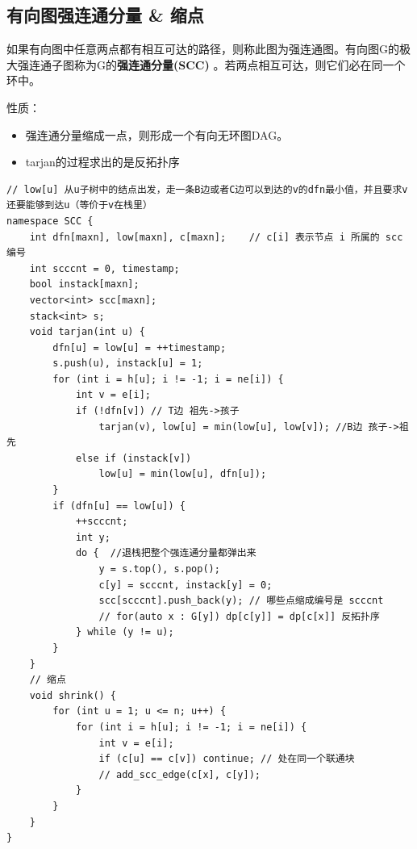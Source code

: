 \subsection{有向图强连通分量 \& 缩点}
\par \noindent 如果有向图中任意两点都有相互可达的路径，则称此图为强连通图。有向图G的极大强连通子图称为G的\textbf{强连通分量(SCC)} 。若两点相互可达，则它们必在同一个环中。

\par \noindent 性质：
\begin{itemize}
\item 强连通分量缩成一点，则形成一个有向无环图DAG。
\item tarjan的过程求出的是反拓扑序
\end{itemize}

\begin{verbatim}
// low[u] 从u子树中的结点出发，走一条B边或者C边可以到达的v的dfn最小值，并且要求v还要能够到达u（等价于v在栈里）
namespace SCC {
    int dfn[maxn], low[maxn], c[maxn];    // c[i] 表示节点 i 所属的 scc 编号 
    int scccnt = 0, timestamp;
    bool instack[maxn];
    vector<int> scc[maxn];
    stack<int> s;
    void tarjan(int u) {
        dfn[u] = low[u] = ++timestamp;
        s.push(u), instack[u] = 1;
        for (int i = h[u]; i != -1; i = ne[i]) {
            int v = e[i];
            if (!dfn[v]) // T边 祖先->孩子
                tarjan(v), low[u] = min(low[u], low[v]); //B边 孩子->祖先
            else if (instack[v])
                low[u] = min(low[u], dfn[u]); 
        }
        if (dfn[u] == low[u]) {
            ++scccnt;
            int y;
            do {  //退栈把整个强连通分量都弹出来
                y = s.top(), s.pop();
                c[y] = scccnt, instack[y] = 0;
                scc[scccnt].push_back(y); // 哪些点缩成编号是 scccnt 
                // for(auto x : G[y]) dp[c[y]] = dp[c[x]] 反拓扑序 
            } while (y != u);
        }
    }
    // 缩点
    void shrink() {
        for (int u = 1; u <= n; u++) {
            for (int i = h[u]; i != -1; i = ne[i]) {
                int v = e[i];
                if (c[u] == c[v]) continue; // 处在同一个联通块
                // add_scc_edge(c[x], c[y]);
            }
        }    
    }
}
\end{verbatim}
